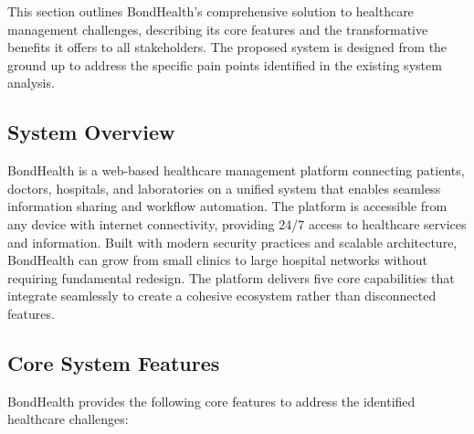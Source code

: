 \justifying
\noindent This section outlines BondHealth's comprehensive solution to healthcare management challenges, describing its core features and the transformative benefits it offers to all stakeholders. The proposed system is designed from the ground up to address the specific pain points identified in the existing system analysis.

\subsection{System Overview}

\justifying
\noindent BondHealth is a web-based healthcare management platform connecting patients, doctors, hospitals, and laboratories on a unified system that enables seamless information sharing and workflow automation. The platform is accessible from any device with internet connectivity, providing 24/7 access to healthcare services and information. Built with modern security practices and scalable architecture, BondHealth can grow from small clinics to large hospital networks without requiring fundamental redesign. The platform delivers five core capabilities that integrate seamlessly to create a cohesive ecosystem rather than disconnected features.

\subsection{Core System Features}

\justifying
\noindent BondHealth provides the following core features to address the identified healthcare challenges:

